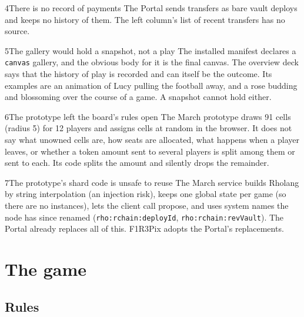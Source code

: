 \documentclass[11pt,a4paper]{article}
\newcommand{\code}[1]{\texttt{#1}}
\begin{document}
\begin{finding}{4}{There is no record of payments}
The Portal sends transfers as bare vault deploys and keeps no history of them. The left
column's list of recent transfers has no source.
\end{finding}

\begin{finding}{5}{The gallery would hold a snapshot, not a play}
The installed manifest declares a \code{canvas} gallery, and the obvious body for it is the
final canvas. The overview deck says that the history of play is recorded and can itself be
the outcome. Its examples are an animation of Lucy pulling the football away, and a rose
budding and blossoming over the course of a game. A snapshot cannot hold either.
\end{finding}

\begin{finding}{6}{The prototype left the board's rules open}
The March prototype draws 91 cells (radius 5) for 12 players and assigns cells at random in
the browser. It does not say what unowned cells are, how seats are allocated, what happens when
a player leaves, or whether a token amount sent to several players is split among them or sent
to each. Its code splits the amount and silently drops the remainder.
\end{finding}

\begin{finding}{7}{The prototype's shard code is unsafe to reuse}
The March service builds Rholang by string interpolation (an injection risk), keeps one global
state per game (so there are no instances), lets the client call propose, and uses system names
the node has since renamed (\code{rho:rchain:deployId}, \code{rho:rchain:revVault}). The
Portal already replaces all of this. F1R3Pix adopts the Portal's replacements.
\end{finding}

\section{The game}\label{sec:game}

\subsection{Rules}
\end{document}

